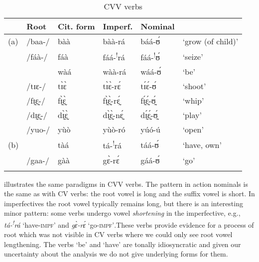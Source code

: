 \documentclass[output=paper,newtxmath,modfonts,nonflat,draftmode]{langsci/langscibook}
\begin{document}
\begin{table}
\begin{tabularx}{\textwidth}{lllllX}
\lsptoprule
& {Root} & {Cit. form} & {Imperf.} & {Nominal} & \\
\midrule
(a)	&/baa-/	&bàà	&bàà-rá	&báá-ʊ́	&‘grow (of child)’\\
	&/fáà-/ &    	fáà &	fáá-\textsuperscript{!}rá	& fáá-\textsuperscript{!}ʊ́	&‘seize’\\
	&	&	wàá	& wàà-rá	&wáá-ʊ́	& ‘be’\\
	&/tɪɛ-/&	tɪ̀ɛ̀	& tɪ̀ɛ̀-rɛ́	&tɪ́ɛ́-ʊ́	& ‘shoot’\\
	&/fɪ̰ɛ̰-/&	fɪ̰̀ɛ̰̀	& fɪ̰̀ɛ̰̀-rɛ̰́	&fɪ̰́ɛ̰́-ʊ̰́	& ‘whip’\\
	&/dɪ̰ɛ̰-/&	dɪ̰̀ɛ̰̀	& dɪ̰̀ɛ̰̀-nɛ̰́	&dɪ̰́ɛ̰́-ʊ̰́	& ‘play’\\
	&/yuo-/	&yùò	& yùò-ró	&yúó-ú	& ‘open’\\
\tablevspace
(b)	&&tàá	& tá-\textsuperscript{!}rá	& táá-ʊ́ & ‘have, own’\\
	&/gaa-/	&gàà	& gɛ̀-rɛ́	&gáá-ʊ́	& ‘go’\\
\lspbottomrule
\end{tabularx}
\caption{CVV verbs}
\label{tab:anttila:8}
\end{table}

  illustrates the same paradigms in CVV verbs. The pattern in action nominals is the same as with CV verbs: the root vowel is long and the suffix vowel is short. In imperfectives the root vowel typically remains long, but there is an interesting minor pattern: some verbs undergo vowel \textit{shortening} in the imperfective, e.g., \textit{tá-\textsuperscript{!}}\textit{rá} ‘have-\textsc{impf}’ and \textit{gɛ̀-rɛ́} ‘go-\textsc{impf’}.\footnotemark[9] These verbs provide evidence for a process of root  which was not visible in CV verbs where we could only see root vowel lengthening. The verbs ‘be’ and ‘have’ are tonally idiosyncratic and given our uncertainty about the analysis we do not give underlying forms for them.

\end{document}
